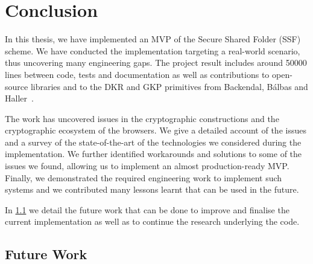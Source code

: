 \chapter{Conclusion}\label{ch:conclusion}

In this thesis, we have implemented an MVP of the
Secure Shared Folder (SSF) scheme. We have conducted
the implementation targeting a real-world scenario,
thus uncovering many engineering gaps.
The project result includes around 50000 lines
between code, tests and documentation as well as
contributions to open-source libraries and to the 
DKR and GKP primitives from Backendal, B{\'a}lbas and Haller~\cite{GKP}.

The work has uncovered issues in the cryptographic constructions
and the cryptographic ecosystem of the browsers.
We give a detailed account of the issues and a survey
of the state-of-the-art of the technologies
we considered during the implementation.
We further identified workarounds and solutions
to some of the issues we found, 
allowing us to implement an almost production-ready MVP.
Finally, we demonstrated the required engineering work 
to implement such systems and we contributed many lessons learnt
that can be used in the future.


In \cref{sc:future-work} we detail
the future work that can be done to improve and finalise
the current implementation as well as to continue 
the research underlying the code.


\section{Future Work}\label{sc:future-work}


